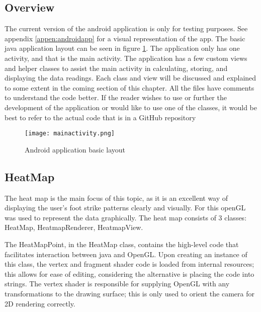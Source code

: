 \subsection{Overview}
The current version of the android application is only for testing purposes. See appendix \ref{appen:androidapp} for a visual representation of the app. The basic java application layout can be seen in figure \ref{fig:javalayout}. The application only has one activity, and that is the main activity. The application has a few custom views and helper classes to assist the main activity in calculating, storing, and displaying the data readings. Each class and view will be discussed and explained to some extent in the coming section of this chapter. All the files have comments to understand the code better. If the reader wishes to use or further the development of the application or would like to use one of the classes, it would be best to refer to the actual code that is in a GitHub repository 

\begin{figure}[!htb]
  \centering
  \texttt{[image: mainactivity.png]}
  \caption{Android application basic layout}
  \label{fig:javalayout}
\end{figure}

\subsection{HeatMap}
The heat map is the main focus of this topic, as it is an excellent way of displaying the user's foot strike patterns clearly and visually. For this openGL was used to represent the data graphically. The heat map consists of 3 classes: HeatMap, HeatmapRenderer, HeatmapView.

The HeatMapPoint, in the HeatMap class, contains the high-level code that facilitates interaction between java and OpenGL. Upon creating an instance of this class, the vertex and fragment shader code is loaded from internal resources; this allows for ease of editing, considering the alternative is placing the code into strings. 
The vertex shader is responsible for supplying OpenGL with any transformations to the drawing surface; this is only used to orient the camera for 2D rendering correctly.


